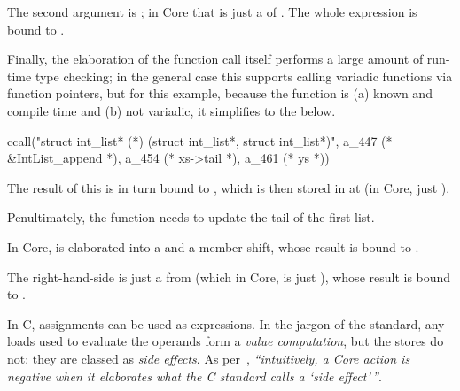 The second argument is ; in Core that is just a  %
of . The whole expression is bound to .


Finally, the elaboration of the function call itself performs a large amount of
run-time type checking; in the general case this supports calling variadic
functions via function pointers, but for this example, because the function is
(a) known and compile time and (b) not variadic, it simplifies to the below.

\begin{corecode}
ccall("struct int_list* (*) (struct int_list*, struct int_list*)",
      a_447 (* &IntList_append *),
      a_454 (* xs->tail *),
      a_461 (* ys *))
\end{corecode}

The result of this is in turn bound to , which is then
stored in at  (in Core, just ).


Penultimately, the  function needs to update the tail
of the first list.


In Core,  is elaborated into a  %
and a member shift, whose result is bound to .


The right-hand-side is just a  from  %
(which in Core, is just ), whose result is bound to
.


In C, assignments can be used as expressions. In the jargon of the standard,
any loads used to evaluate the operands form a \emph{value computation}, but
the stores do not: they are classed as \emph{side effects}. As
per~\textcite[p61, p66, p99]{memarian2022cerberus}, \emph{``intuitively, a Core action
is negative when it elaborates what the C standard calls a `side
effect'\,''}.

